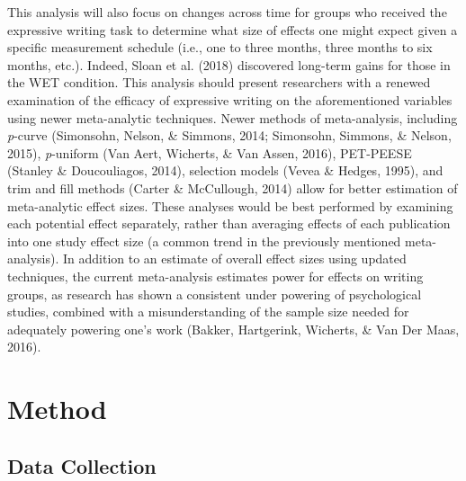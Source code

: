 \documentclass[man]{apa6}
\theoremstyle{definition}
\theoremstyle{definition}
\theoremstyle{definition}
\theoremstyle{remark}
\begin{document}
This analysis will also focus on changes across time for groups who
received the expressive writing task to determine what size of effects
one might expect given a specific measurement schedule (i.e., one to
three months, three months to six months, etc.). Indeed, Sloan et al.
(2018) discovered long-term gains for those in the WET condition. This
analysis should present researchers with a renewed examination of the
efficacy of expressive writing on the aforementioned variables using
newer meta-analytic techniques. Newer methods of meta-analysis,
including \emph{p}-curve (Simonsohn, Nelson, \& Simmons, 2014;
Simonsohn, Simmons, \& Nelson, 2015), \emph{p}-uniform (Van Aert,
Wicherts, \& Van Assen, 2016), PET-PEESE (Stanley \& Doucouliagos,
2014), selection models (Vevea \& Hedges, 1995), and trim and fill
methods (Carter \& McCullough, 2014) allow for better estimation of
meta-analytic effect sizes. These analyses would be best performed by
examining each potential effect separately, rather than averaging
effects of each publication into one study effect size (a common trend
in the previously mentioned meta-analysis). In addition to an estimate
of overall effect sizes using updated techniques, the current
meta-analysis estimates power for effects on writing groups, as research
has shown a consistent under powering of psychological studies, combined
with a misunderstanding of the sample size needed for adequately
powering one's work (Bakker, Hartgerink, Wicherts, \& Van Der Maas,
2016).

\section{Method}\label{method}

\subsection{Data Collection}\label{data-collection}
\end{document}

